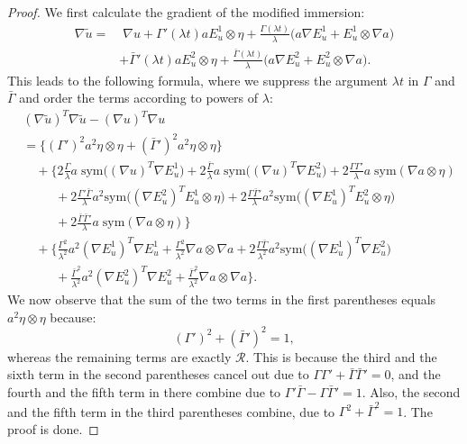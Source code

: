 \documentclass[reqno,twoside,11pt]{amsart}
\newcommand{\sym}{\mathrm{sym}}
\numberwithin{equation}{section}
\theoremstyle{plain}
\theoremstyle{definition}
\begin{document}
\begin{proof}
We first calculate the gradient of the modified immersion:
\begin{equation*}
\begin{split}
\nabla \tilde u = & \; \nabla u + \Gamma'(\lambda t) a E_u^1\otimes\eta +  
\frac{\Gamma(\lambda t)}{\lambda}\big( a \nabla E_u^1 + E^1_u\otimes\nabla a\big)
\\ & + \bar\Gamma'(\lambda t) a E_u^2\otimes\eta +  
\frac{\bar\Gamma(\lambda t)}{\lambda}\big( a \nabla E_u^2 +
E^2_u\otimes\nabla a\big).
\end{split}
\end{equation*}
This leads to the following formula, where we suppress the argument
$\lambda t$ in $\Gamma$ and $\bar\Gamma$ and order the terms according to powers of $\lambda$:
\begin{equation*}
\begin{split}
& (\nabla \tilde u)^T\nabla \tilde u - (\nabla u)^T\nabla u  \\ & =
\Big\{(\Gamma')^2a^2\eta\otimes\eta + (\bar\Gamma')^2a^2\eta\otimes\eta \Big\}
\\ & \quad + \Big\{ 2\frac{\Gamma}{\lambda} a\; \sym\big((\nabla u)^T \nabla E^1_u\big) 
+ 2\frac{\bar \Gamma}{\lambda} a \;\sym\big((\nabla u)^T \nabla E^2_u\big) 
+ 2\frac{\Gamma\Gamma'}{\lambda} a \; \sym(\nabla a \otimes\eta)  \\ & 
\qquad \; \; 
+ 2\frac{\Gamma'\bar\Gamma}{\lambda} a^2 \sym\big((\nabla E_u^2)^TE^1_u \otimes\eta\big) 
+ 2\frac{\Gamma\bar\Gamma'}{\lambda} a^2 \sym\big((\nabla E_u^1)^TE^2_u \otimes\eta\big) 
\\ & \qquad\;\; + 2\frac{\bar\Gamma\bar\Gamma'}{\lambda} a \;\sym(\nabla a \otimes\eta) \Big\}
\\ & \quad + \Big\{\frac{\Gamma^2}{\lambda^2} a^2 (\nabla E_u^1)^T\nabla E^1_u 
+ \frac{\Gamma^2}{\lambda^2} \nabla a\otimes\nabla a 
+ 2 \frac{\Gamma\bar\Gamma}{\lambda^2} a^2 \sym\big((\nabla E_u^1)^T\nabla E^2_u \big)
\\ & \qquad \; \; + \frac{\bar\Gamma^2}{\lambda^2} a^2 (\nabla E_u^2)^T\nabla E^2_u + 
\frac{\bar\Gamma^2}{\lambda^2} \nabla a\otimes\nabla a\Big\}.
\end{split}
\end{equation*}
We now observe that the sum of the two terms in the first parentheses
equals $a^2\eta\otimes\eta$ because: 
$$(\Gamma')^2+(\bar\Gamma')^2=1,$$
whereas the remaining terms are exactly
$\mathcal R$. This is because the third and the sixth term in the
second parentheses cancel out due to
$\Gamma\Gamma' + \bar\Gamma\bar\Gamma'=0$, and the fourth and the fifth
term in there combine due to
$\Gamma'\bar\Gamma - \Gamma\bar\Gamma'=1$. Also, the second and the
fifth term in the third parentheses combine, due to
$\Gamma^2+\bar\Gamma^2=1$. The proof is done.
\end{proof}
\end{document}
